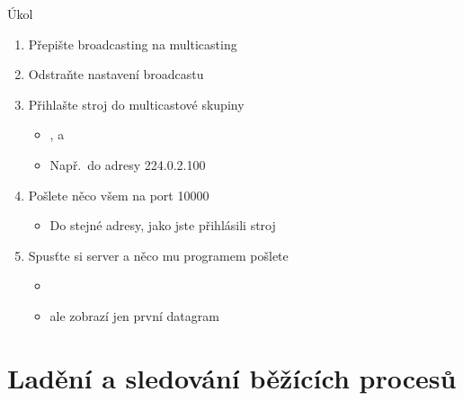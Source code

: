 \begin{frame}{Úkol}

  \begin{enumerate}
    \item Přepište broadcasting na multicasting
    \item Odstraňte nastavení broadcastu
    \item Přihlašte stroj do multicastové skupiny
    \begin{itemize}
      \item {},  a 
      \item Např.\ do adresy 224.0.2.100
    \end{itemize}

    \item Pošlete něco všem na port 10000
    \begin{itemize}
      \item Do stejné adresy, jako jste přihlásili stroj
    \end{itemize}

    \item Spusťte si  server a něco mu programem pošlete
    \begin{itemize}
      \item {}
      \item {} ale zobrazí jen první datagram
    \end{itemize}
  \end{enumerate}

\end{frame}

\section{Ladění a sledování běžících procesů}
\frame{\sectionpage}

